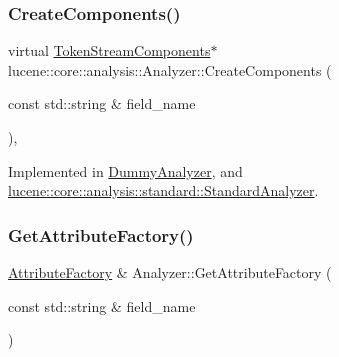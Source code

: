\mbox{\label{classlucene_1_1core_1_1analysis_1_1Analyzer_a9b7dc3c598057fbf4e9b5f48066cb54a}} 
\subsubsection{\texorpdfstring{Create\+Components()}{CreateComponents()}}
{\footnotesize\ttfamily virtual \mbox{\hyperlink{classlucene_1_1core_1_1analysis_1_1TokenStreamComponents}{Token\+Stream\+Components}}$\ast$ lucene\+::core\+::analysis\+::\+Analyzer\+::\+Create\+Components (\begin{DoxyParamCaption}\item[{const std\+::string \&}]{field\+\_\+name }\end{DoxyParamCaption})\hspace{0.3cm}{\ttfamily [protected]}, {}}



Implemented in \mbox{\hyperlink{classDummyAnalyzer_aeeb24aa6449d4bf7c4adc6a5c63a5c0e}{Dummy\+Analyzer}}, and \mbox{\hyperlink{classlucene_1_1core_1_1analysis_1_1standard_1_1StandardAnalyzer_a0d569e3e48f2060a4698481ec1b49d12}{lucene\+::core\+::analysis\+::standard\+::\+Standard\+Analyzer}}.

\mbox{\label{classlucene_1_1core_1_1analysis_1_1Analyzer_af0c3e02aef0e7a391b0abdbca218951b}} 
\subsubsection{\texorpdfstring{Get\+Attribute\+Factory()}{GetAttributeFactory()}}
{\footnotesize\ttfamily \mbox{\hyperlink{classlucene_1_1core_1_1util_1_1AttributeFactory}{Attribute\+Factory}} \& Analyzer\+::\+Get\+Attribute\+Factory (\begin{DoxyParamCaption}\item[{const std\+::string \&}]{field\+\_\+name }\end{DoxyParamCaption})\hspace{0.3cm}{\ttfamily [protected]}}

